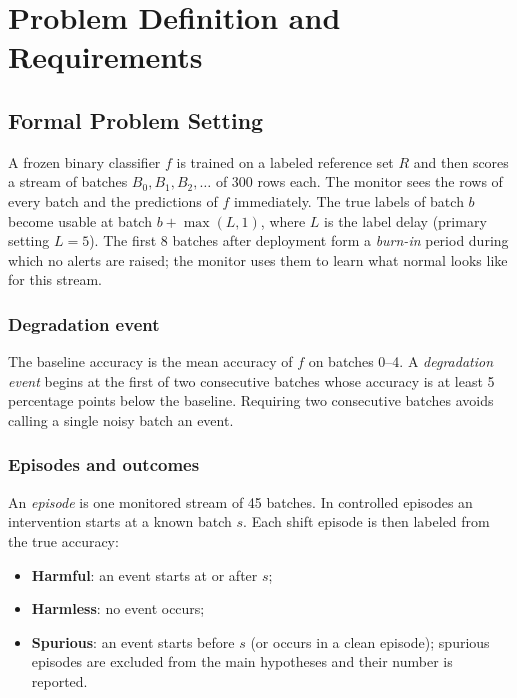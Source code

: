 
\chapter{Problem Definition and Requirements}
\label{ch:problem}

\section{Formal Problem Setting}
A frozen binary classifier $f$ is trained on a labeled reference set $R$ and then scores a stream of batches $B_0, B_1, B_2, \dots$ of 300 rows each. The monitor sees the rows of every batch and the predictions of $f$ immediately. The true labels of batch $b$ become usable at batch $b+\max(L,1)$, where $L$ is the label delay (primary setting $L=5$). The first 8 batches after deployment form a \emph{burn-in} period during which no alerts are raised; the monitor uses them to learn what normal looks like for this stream.

\subsection{Degradation event}
The baseline accuracy is the mean accuracy of $f$ on batches 0--4. A \emph{degradation event} begins at the first of two consecutive batches whose accuracy is at least 5 percentage points below the baseline. Requiring two consecutive batches avoids calling a single noisy batch an event.

\subsection{Episodes and outcomes}
An \emph{episode} is one monitored stream of 45 batches. In controlled episodes an intervention starts at a known batch $s$. Each shift episode is then labeled from the true accuracy:
\begin{itemize}
\item \textbf{Harmful}: an event starts at or after $s$;
\item \textbf{Harmless}: no event occurs;
\item \textbf{Spurious}: an event starts before $s$ (or occurs in a clean episode); spurious episodes are excluded from the main hypotheses and their number is reported.
\end{itemize}

